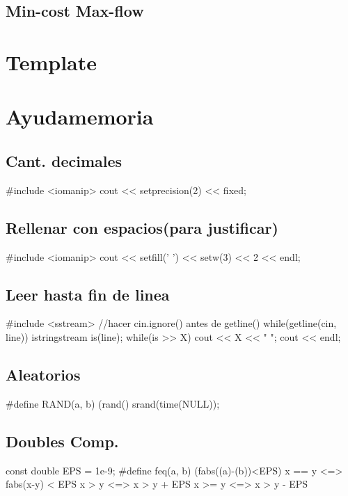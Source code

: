 \subsection{Min-cost Max-flow}


\section{Template}%


\section{Ayudamemoria}%
\subsection*{Cant. decimales}
\begin{code}
#include <iomanip>
cout << setprecision(2) << fixed;
\end{code}
\subsection*{Rellenar con espacios(para justificar)}
\begin{code}
#include <iomanip>
cout << setfill(' ') << setw(3) << 2 << endl;
\end{code}
\subsection*{Leer hasta fin de linea}
\begin{code}
#include <sstream>
//hacer cin.ignore() antes de getline()
while(getline(cin, line)){
   	 istringstream is(line);
   	 while(is >> X)
   		 cout << X << " ";
   	 cout << endl;
}
\end{code}
\subsection*{Aleatorios}
\begin{code}
#define RAND(a, b) (rand()%
srand(time(NULL));
\end{code}
\subsection*{Doubles Comp.}
\begin{code}
const double EPS = 1e-9;
#define feq(a, b) (fabs((a)-(b))<EPS)
x == y	<=> fabs(x-y) < EPS
x >  y	<=> x > y + EPS
x >= y	<=> x > y - EPS
\end{code}
